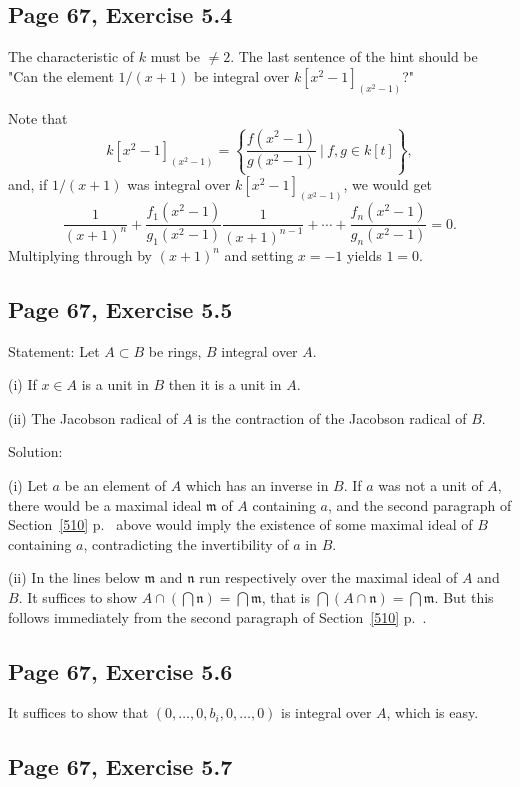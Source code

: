 \documentclass[parskip=half,fontsize=12pt]{scrartcl}%
\newcommand{\mf}{\mathfrak}
\newcommand{\mmm}{\mf m}
\newcommand{\nnn}{\mf n}
\begin{document}
\subsection{Page 67, Exercise 5.4}%

The characteristic of $k$ must be $\ne2$. The last sentence of the hint should be "Can the element $1/(x + 1)$ be integral over $k[x^2-1]_{(x^2-1)}$?" 

Note that 
$$
k[x^2-1]_{(x^2-1)}=\left\{\frac{f(x^2-1)}{g(x^2-1)}\ \bigg|\ f,g\in k[t]\right\},
$$ 
and, if $1/(x + 1)$ was integral over $k[x^2-1]_{(x^2-1)}$, we would get 
$$
\frac1{(x+1)^n}+\frac{f_1(x^2-1)}{g_1(x^2-1)}\frac1{(x+1)^{n-1}}+\cdots+\frac{f_n(x^2-1)}{g_n(x^2-1)}=0.
$$ 
Multiplying through by $(x+1)^n$ and setting $x=-1$ yields $1=0$. 

\subsection{Page 67, Exercise 5.5}\label{55}%

Statement: Let $A\subset B$ be rings, $B$ integral over $A$.

(i) If $x\in A$ is a unit in $B$ then it is a unit in $A$.

(ii) The Jacobson radical of $A$ is the contraction of the Jacobson radical of $B$. 

Solution: 

(i) Let $a$ be an element of $A$ which has an inverse in $B$. If $a$ was not a unit of $A$, there would be a maximal ideal $\mmm$ of $A$ containing $a$, and the second paragraph of Section~\ref{510} p.~\pageref{510} above would imply the existence of some maximal ideal of $B$ containing $a$, contradicting the invertibility of $a$ in $B$. 

(ii) In the lines below $\mmm$ and $\nnn$ run respectively over the maximal ideal of $A$ and $B$. It suffices to show $A\cap(\bigcap\nnn)=\bigcap\mmm$, that is $\bigcap(A\cap\nnn)=\bigcap\mmm$. But this follows immediately from the second paragraph of Section~\ref{510} p.~\pageref{510}. 

\subsection{Page 67, Exercise 5.6}%

It suffices to show that $(0,\dots,0,b_i,0,\dots,0)$ is integral over $A$, which is easy. 

\subsection{Page 67, Exercise 5.7}%
\end{document}
